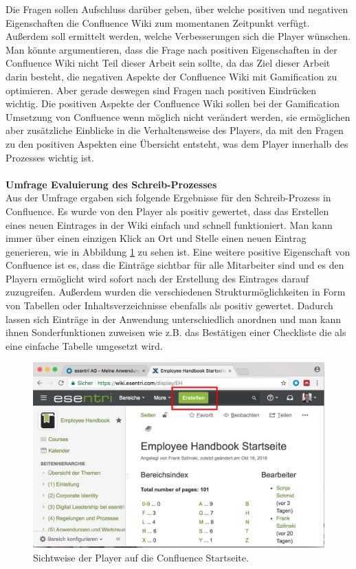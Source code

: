 \documentclass[a4paper,12pt,twoside]{scrartcl}
\begin{document}
Die Fragen sollen Aufschluss darüber geben, über welche positiven und negativen Eigenschaften die Confluence Wiki zum momentanen Zeitpunkt verfügt. Außerdem soll ermittelt werden, welche Verbesserungen sich die Player wünschen. Man könnte argumentieren, dass die Frage nach positiven Eigenschaften in der Confluence Wiki nicht Teil dieser Arbeit sein sollte, da das Ziel dieser Arbeit darin besteht, die negativen Aspekte der Confluence Wiki mit Gamification zu optimieren. Aber gerade deswegen sind Fragen nach positiven Eindrücken wichtig. Die positiven Aspekte der Confluence Wiki sollen bei der Gamification Umsetzung von Confluence wenn möglich nicht verändert werden, sie ermöglichen aber zusätzliche Einblicke in die Verhaltensweise des Players, da mit den Fragen zu den positiven Aspekten eine Übersicht entsteht, was dem Player innerhalb des Prozesses wichtig ist.
\\\\
\textbf{Umfrage Evaluierung des Schreib-Prozesses}\\
Aus der Umfrage ergaben sich folgende Ergebnisse für den Schreib-Prozess in Confluence. Es wurde von den Player als positiv gewertet, dass das Erstellen eines neuen Eintrages in der Wiki einfach und schnell funktioniert. Man kann immer über einen einzigen Klick an Ort und Stelle einen neuen Eintrag generieren, wie in Abbildung \ref{ConfluenceEintragErstellen} zu sehen ist. Eine weitere positive Eigenschaft von Confluence ist es, dass die Einträge sichtbar für alle Mitarbeiter sind und es den Playern ermöglicht wird sofort nach der Erstellung des Eintrages darauf zuzugreifen. Außerdem wurden die verschiedenen Strukturmöglichkeiten in Form von Tabellen oder Inhaltsverzeichnisse ebenfalls als positiv gewertet. Dadurch lassen sich Einträge in der Anwendung unterschiedlich anordnen und man kann ihnen Sonderfunktionen zuweisen wie z.B. das Bestätigen einer Checkliste die als eine einfache Tabelle umgesetzt wird.
\begin{figure}[h!]
\begin{center}
\includegraphics[scale = 0.4]{Bilder/ConfluenceStart.eps}
\caption{Sichtweise der Player auf die Confluence Startseite.}
\label{ConfluenceEintragErstellen}
\end{center}
\end{figure} 
\end{document}
